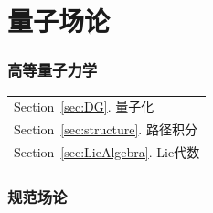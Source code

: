 \documentclass[10pt]{article}
\begin{document}
\newpage

\part{量子场论}\label{Part:QFT}
\section{高等量子力学}\label{sec:QM}
	\begin{margintable}\vspace{1.4in}\footnotesize
		\begin{tabularx}{\marginparwidth}{|X}
		Section~\ref{sec:DG}. 量子化\\
		Section~\ref{sec:structure}. 路径积分\\
		Section~\ref{sec:LieAlgebra}. Lie代数\\
		\end{tabularx}
	\end{margintable}

	\section{规范场论}\label{sec:GFT}
	
\end{document}
